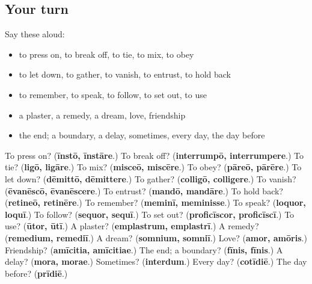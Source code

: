 \subsection*{Your turn}
Say these aloud:

\begin{itemize}
\raggedright
  \item to press on, to break off, to tie, to mix, to obey
  \item to let down, to gather, to vanish, to entrust, to hold back
  \item to remember, to speak, to follow, to set out, to use
  \item a plaster, a remedy, a dream, love, friendship
  \item the end; a boundary, a delay, sometimes, every day, the day before
\end{itemize}

\begin{tcolorbox}[breakable,colback=teal!4,colframe=teal!35!black,title={Before you move on}]
To press on? (\textbf{īnstō, īnstāre}.) To break off? (\textbf{interrumpō, interrumpere}.) To tie? (\textbf{ligō, ligāre}.) To mix? (\textbf{misceō, miscēre}.) To obey? (\textbf{pāreō, pārēre}.) To let down? (\textbf{dēmittō, dēmittere}.) To gather? (\textbf{colligō, colligere}.) To vanish? (\textbf{ēvanēscō, ēvanēscere}.) To entrust? (\textbf{mandō, mandāre}.) To hold back? (\textbf{retineō, retinēre}.) To remember? (\textbf{meminī, meminisse}.) To speak? (\textbf{loquor, loquī}.) To follow? (\textbf{sequor, sequī}.) To set out? (\textbf{proficīscor, proficīscī}.) To use? (\textbf{ūtor, ūtī}.) A plaster? (\textbf{emplastrum, emplastrī}.) A remedy? (\textbf{remedium, remediī}.) A dream? (\textbf{somnium, somniī}.) Love? (\textbf{amor, amōris}.) Friendship? (\textbf{amīcitia, amīcitiae}.) The end; a boundary? (\textbf{fīnis, fīnis}.) A delay? (\textbf{mora, morae}.) Sometimes? (\textbf{interdum}.) Every day? (\textbf{cotīdiē}.) The day before? (\textbf{prīdiē}.)
\end{tcolorbox}

